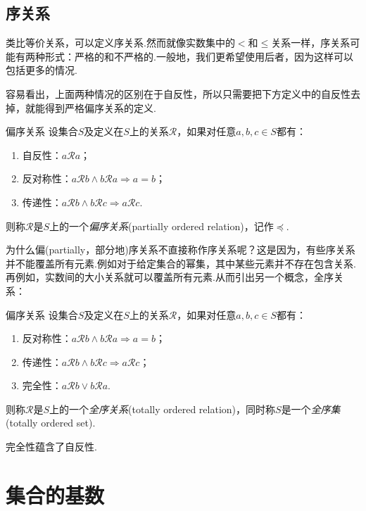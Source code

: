 \subsection{序关系}

类比等价关系，可以定义序关系.然而就像实数集中的$<$和$\leq$关系一样，序关系可能有两种形式：严格的和不严格的.一般地，我们更希望使用后者，因为这样可以包括更多的情况.

容易看出，上面两种情况的区别在于自反性，所以只需要把下方定义中的自反性去掉，就能得到严格偏序关系的定义.

\begin{definition}{偏序关系}
	设集合$S$及定义在$S$上的关系$\mathcal{R}$，如果对任意$a,b,c \in S$都有：
	\begin{enumerate}
		\item 自反性：$a\mathcal{R} a$；
		\item 反对称性：$a\mathcal{R} b \wedge b\mathcal{R} a \Rightarrow a=b$；
		\item 传递性：$a\mathcal{R} b \wedge b\mathcal{R} c \Rightarrow a\mathcal{R} c$.
	\end{enumerate}
	则称$\mathcal{R}$是$S$上的一个\textit{偏序关系}(partially ordered relation)，记作$\preceq$.
\end{definition}

为什么偏(partially，部分地)序关系不直接称作序关系呢？这是因为，有些序关系并不能覆盖所有元素.例如对于给定集合的幂集，其中某些元素并不存在包含关系.再例如，实数间的大小关系就可以覆盖所有元素.从而引出另一个概念，全序关系：

\begin{definition}{偏序关系}
	设集合$S$及定义在$S$上的关系$\mathcal{R}$，如果对任意$a,b,c \in S$都有：
	\begin{enumerate}
		\item 反对称性：$a\mathcal{R} b \wedge b\mathcal{R} a \Rightarrow a=b$；
		\item 传递性：$a\mathcal{R} b \wedge b\mathcal{R} c \Rightarrow a\mathcal{R} c$；
		\item 完全性：$a\mathcal{R} b \vee b\mathcal{R} a$.
	\end{enumerate}
	则称$\mathcal{R}$是$S$上的一个\textit{全序关系}(totally ordered relation)，同时称$S$是一个\textit{全序集}(totally ordered set).
\end{definition}
\begin{remark}
	完全性蕴含了自反性.
\end{remark}


\section{集合的基数}

